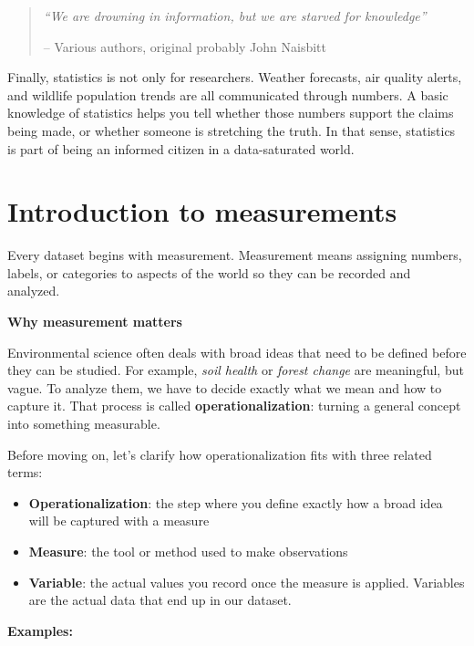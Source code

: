 \documentclass[
  letterpaper,
  DIV=11,
  numbers=noendperiod]{scrreprt}
\providecommand{\tightlist}{%
  \setlength{\itemsep}{0pt}\setlength{\parskip}{0pt}}\usepackage{longtable,booktabs,array}
\begin{document}
\begin{quote}
\emph{``We are drowning in information, but we are starved for
knowledge''}

-- Various authors, original probably John Naisbitt
\end{quote}

Finally, statistics is not only for researchers. Weather forecasts, air
quality alerts, and wildlife population trends are all communicated
through numbers. A basic knowledge of statistics helps you tell whether
those numbers support the claims being made, or whether someone is
stretching the truth. In that sense, statistics is part of being an
informed citizen in a data-saturated world.

\section{Introduction to
measurements}\label{introduction-to-measurements}

Every dataset begins with measurement. Measurement means assigning
numbers, labels, or categories to aspects of the world so they can be
recorded and analyzed.

\textbf{Why measurement matters}

Environmental science often deals with broad ideas that need to be
defined before they can be studied. For example, \emph{soil health} or
\emph{forest change} are meaningful, but vague. To analyze them, we have
to decide exactly what we mean and how to capture it. That process is
called \textbf{operationalization}: turning a general concept into
something measurable.

Before moving on, let's clarify how operationalization fits with three
related terms:

\begin{itemize}
\tightlist
\item
  \textbf{Operationalization}: the step where you define exactly how a
  broad idea will be captured with a measure
\item
  \textbf{Measure}: the tool or method used to make observations
\item
  \textbf{Variable}: the actual values you record once the measure is
  applied. Variables are the actual data that end up in our dataset.
\end{itemize}

\textbf{Examples:}
\end{document}
